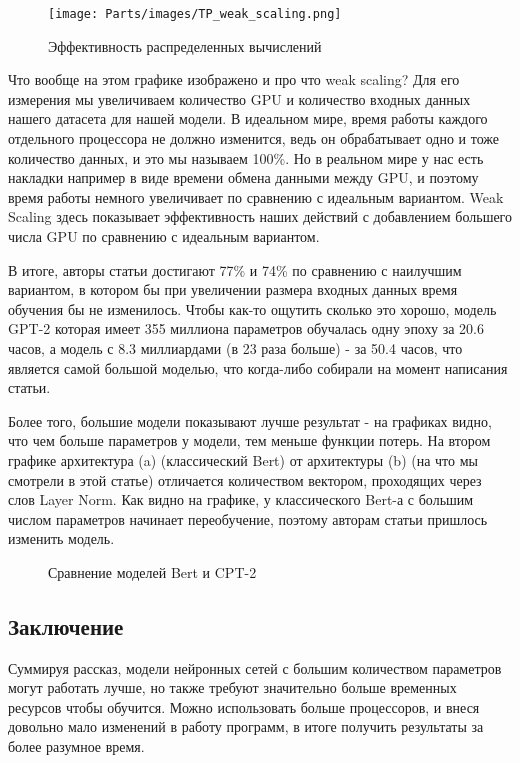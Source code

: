 \begin{figure}[H]
    \centering
    \texttt{[image: Parts/images/TP\_weak\_scaling.png]}
    \caption{Эффективность распределенных вычислений}
\end{figure}


Что вообще на этом графике изображено и про что weak scaling? Для его измерения мы увеличиваем количество GPU и количество входных данных нашего датасета для нашей модели. В идеальном мире, время работы каждого отдельного процессора не должно изменится, ведь он обрабатывает одно и тоже количество данных, и это мы называем 100\%. Но в реальном мире у нас есть накладки например в виде времени обмена данными между GPU, и поэтому время работы немного увеличивает по сравнению с идеальным вариантом. Weak Scaling здесь показывает эффективность наших действий с добавлением большего числа GPU по сравнению с идеальным вариантом.

В итоге, авторы статьи достигают 77\% и 74\% по сравнению с наилучшим вариантом, в котором бы при увеличении размера входных данных время обучения бы не изменилось. Чтобы как-то ощутить сколько это хорошо, модель GPT-2 которая имеет 355 миллиона параметров обучалась одну эпоху за 20.6 часов, а модель с 8.3 миллиардами (в 23 раза больше) - за 50.4 часов, что является самой большой моделью, что когда-либо собирали на момент написания статьи.

Более того, большие модели показывают лучше результат - на графиках видно, что чем больше параметров у модели, тем меньше функции потерь. На втором графике архитектура (a) (классический Bert) от архитектуры (b) (на что мы смотрели в этой статье) отличается количеством вектором, проходящих через слов Layer Norm. Как видно на графике, у классического Bert-а с большим числом параметров начинает переобучение, поэтому авторам статьи пришлось изменить модель.  


\begin{figure}[H]
    \centering
    \caption{Сравнение моделей Bert и CPT-2}
\end{figure}


\subsection{Заключение}

Суммируя рассказ, модели нейронных сетей с большим количеством параметров могут работать лучше, но также требуют значительно больше временных ресурсов чтобы обучится. Можно использовать больше процессоров, и внеся довольно мало изменений в работу программ, в итоге получить результаты за более разумное время.
